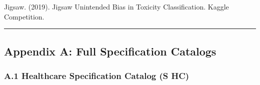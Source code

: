 \documentclass[
]{article}
\begin{document}
Jigsaw. (2019). Jigsaw Unintended Bias in Toxicity Classification. Kaggle Competition.

\begin{center}\rule{0.5\linewidth}{0.5pt}\end{center}

\hypertarget{appendix-a-full-specification-catalogs}{%
\subsection{Appendix A: Full Specification Catalogs}\label{appendix-a-full-specification-catalogs}}

\hypertarget{a1-healthcare-specification-catalog-s_texthc}{%
\subsubsection{A.1 Healthcare Specification Catalog (S HC)}\label{a1-healthcare-specification-catalog-s_texthc}}
\end{document}
